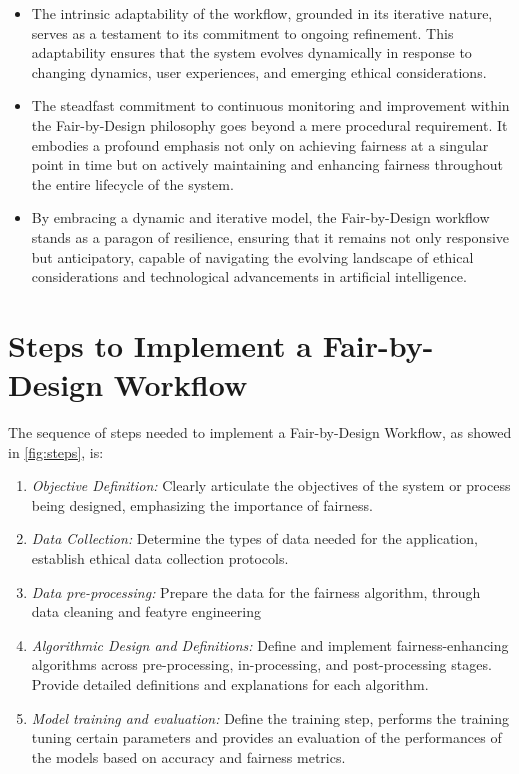 \begin{enumerate}[label=\arabic*.]
\begin{itemize}
        \item The intrinsic adaptability of the workflow, grounded in its iterative nature, serves as a testament to its commitment to ongoing refinement. This adaptability ensures that the system evolves dynamically in response to changing dynamics, user experiences, and emerging ethical considerations.
    
        \item The steadfast commitment to continuous monitoring and improvement within the Fair-by-Design philosophy goes beyond a mere procedural requirement. It embodies a profound emphasis not only on achieving fairness at a singular point in time but on actively maintaining and enhancing fairness throughout the entire lifecycle of the system.
    
        \item By embracing a dynamic and iterative model, the Fair-by-Design workflow stands as a paragon of resilience, ensuring that it remains not only responsive but anticipatory, capable of navigating the evolving landscape of ethical considerations and technological advancements in artificial intelligence.
    
    \end{itemize}

\end{enumerate}

\section{Steps to Implement a Fair-by-Design Workflow}
\label{section:steps}

The sequence of steps needed to implement a Fair-by-Design Workflow, as showed in \cref{fig:steps}, is:

\begin{enumerate}

    \item \emph{Objective Definition:} Clearly articulate the objectives of the system or process being designed, emphasizing the importance of fairness.

    \item \emph{Data Collection:} Determine the types of data needed for the application, establish ethical data collection protocols.

    \item \emph{Data pre-processing:} Prepare the data for the fairness algorithm, through data cleaning and featyre engineering
    
    \item \emph{Algorithmic Design and Definitions:} Define and implement fairness-enhancing algorithms across pre-processing, in-processing, and post-processing stages. Provide detailed definitions and explanations for each algorithm.

    \item \emph{Model training and evaluation:} Define the training step, performs the training tuning certain parameters and provides an evaluation of the performances of the models based on accuracy and fairness metrics.

\end{enumerate}

